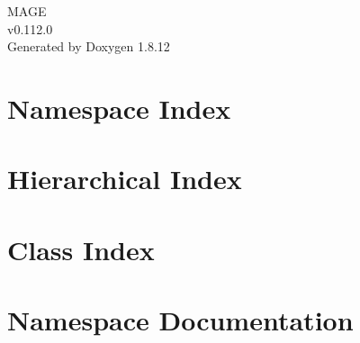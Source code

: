 \documentclass[twoside]{book}
\newcommand{\+}{\discretionary{\mbox{\scriptsize$\hookleftarrow$}}{}{}}
\newcommand{\clearemptydoublepage}{%
  \newpage{\pagestyle{empty}\cleardoublepage}%
}
\begin{document}
\hypersetup{pageanchor=false,
             bookmarksnumbered=true,
             pdfencoding=unicode
            }
\begin{titlepage}
\vspace*{7cm}
\begin{center}%
{\Large M\+A\+GE \\[1ex]\large v0.\+112.\+0 }\\
\vspace*{1cm}
{\large Generated by Doxygen 1.8.12}\\
\end{center}
\end{titlepage}
\clearemptydoublepage
{}
\tableofcontents
\clearemptydoublepage
{}
\hypersetup{pageanchor=true}

\chapter{Namespace Index}

\chapter{Hierarchical Index}

\chapter{Class Index}

\chapter{Namespace Documentation}






\end{document}
